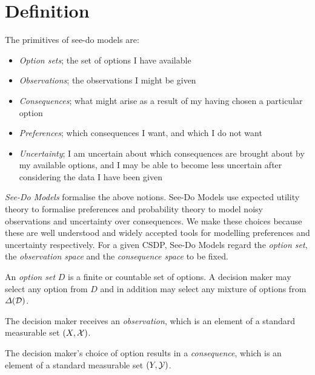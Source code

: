 \section{Definition}

The primitives of see-do models are:

\begin{itemize}
    \item \emph{Option sets}; the set of options I have available
    \item \emph{Observations}; the observations I might be given
    \item \emph{Consequences}; what might arise as a result of my having chosen a particular option
    \item \emph{Preferences}; which consequences I want, and which I do not want
    \item \emph{Uncertainty}; I am uncertain about which consequences are brought about by my available options, and I may be able to become less uncertain after considering the data I have been given
\end{itemize}

\emph{See-Do Models} formalise the above notions. See-Do Models use expected utility theory to formalise preferences and probability theory to model noisy observations and uncertainty over consequences. We make these choices because these are well understood and widely accepted tools for modelling preferences and uncertainty respectively. For a given CSDP, See-Do Models regard the \emph{option set}, the \emph{observation space} and the \emph{consequence space} to be fixed.

\begin{definition}
An \emph{option set} $D$ is a finite or countable set of options. A decision maker may select any option from $D$ and in addition may select any mixture of options from $\Delta(\mathcal{D})$.
\end{definition}

\begin{definition}
The decision maker receives an \emph{observation}, which is an element of a standard measurable set $(X,\mathcal{X})$.
\end{definition}

\begin{definition}
The decision maker's choice of option results in a \emph{consequence}, which is an element of a standard measurable set $(Y,\mathcal{Y})$.
\end{definition}

